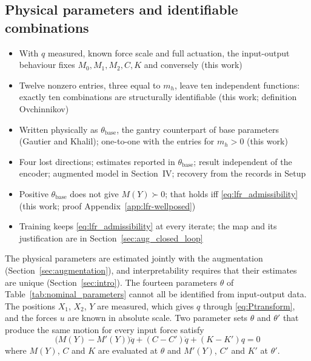 \subsection{Physical parameters and identifiable combinations}\label{sec:params}
\ifdraft
\begin{itemize}
\item With $q$ measured, known force scale and full actuation, the input-output behaviour fixes $M_0,M_1,M_2,C,K$ and conversely (this work)
\item Twelve nonzero entries, three equal to $m_h$, leave ten independent functions: exactly ten combinations are structurally identifiable (this work; definition Ovchinnikov)
\item Written physically as $\theta_{\mathrm{base}}$, the gantry counterpart of base parameters (Gautier and Khalil); one-to-one with the entries for $m_h>0$ (this work)
\item Four lost directions; estimates reported in $\theta_{\mathrm{base}}$; result independent of the encoder; augmented model in Section~IV; recovery from the records in Setup
\item Positive $\theta_{\mathrm{base}}$ does not give $M(Y)\succ0$; that holds iff \eqref{eq:lfr_admissibility} (this work; proof Appendix~\ref{app:lfr-wellposed})
\item Training keeps \eqref{eq:lfr_admissibility} at every iterate; the map and its justification are in Section~\ref{sec:aug_closed_loop}
\end{itemize}
\fi
The physical parameters are estimated jointly with the
augmentation (Section~\ref{sec:augmentation}), and interpretability requires
that their estimates are unique (Section~\ref{sec:intro}).
The fourteen parameters $\theta$ of
Table~\ref{tab:nominal_parameters} cannot all be identified from input-output data.
The positions $X_1$, $X_2$, $Y$ are measured, which gives
$q$ through \eqref{eq:Ptransform}, and the forces $u$ are known in absolute scale.
Two parameter sets $\theta$ and $\theta'$ that produce the same
motion for every input force satisfy
\begin{equation*}
  \bigl(M(Y)-M'(Y)\bigr)\ddot q+(C-C')\dot q+(K-K')q=0
\end{equation*}
where $M(Y)$, $C$ and $K$ are evaluated at $\theta$ and
$M'(Y)$, $C'$ and $K'$ at $\theta'$.

